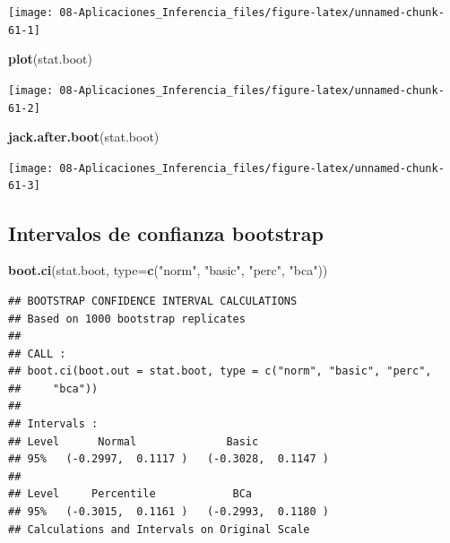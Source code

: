 \documentclass[
]{book}
\newenvironment{Shaded}{\begin{snugshade}}{\end{snugshade}}
\newcommand{\DataTypeTok}[1]{\textcolor[rgb]{0.13,0.29,0.53}{#1}}
\newcommand{\KeywordTok}[1]{\textcolor[rgb]{0.13,0.29,0.53}{\textbf{#1}}}
\newcommand{\NormalTok}[1]{#1}
\newcommand{\OperatorTok}[1]{\textcolor[rgb]{0.81,0.36,0.00}{\textbf{#1}}}
\newcommand{\OtherTok}[1]{\textcolor[rgb]{0.56,0.35,0.01}{#1}}
\newcommand{\StringTok}[1]{\textcolor[rgb]{0.31,0.60,0.02}{#1}}
\theoremstyle{break}
\theoremstyle{definition}
\theoremstyle{definition}
\theoremstyle{definition}
\theoremstyle{remark}
\begin{document}
\begin{Shaded}
\end{Shaded}

\begin{center}\texttt{[image: 08-Aplicaciones\_Inferencia\_files/figure-latex/unnamed-chunk-61-1]} \end{center}

\begin{Shaded}
\begin{Highlighting}[]
\KeywordTok{plot}\NormalTok{(stat.boot)}
\end{Highlighting}
\end{Shaded}

\begin{center}\texttt{[image: 08-Aplicaciones\_Inferencia\_files/figure-latex/unnamed-chunk-61-2]} \end{center}

\begin{Shaded}
\begin{Highlighting}[]
\KeywordTok{jack.after.boot}\NormalTok{(stat.boot)}
\end{Highlighting}
\end{Shaded}

\begin{center}\texttt{[image: 08-Aplicaciones\_Inferencia\_files/figure-latex/unnamed-chunk-61-3]} \end{center}

\hypertarget{intervalos-de-confianza-bootstrap}{%
\subsection{Intervalos de confianza bootstrap}\label{intervalos-de-confianza-bootstrap}}

\begin{Shaded}
\begin{Highlighting}[]
\KeywordTok{boot.ci}\NormalTok{(stat.boot, }\DataTypeTok{type=}\KeywordTok{c}\NormalTok{(}\StringTok{"norm"}\NormalTok{, }\StringTok{"basic"}\NormalTok{, }\StringTok{"perc"}\NormalTok{, }\StringTok{"bca"}\NormalTok{))}
\end{Highlighting}
\end{Shaded}

\begin{verbatim}
## BOOTSTRAP CONFIDENCE INTERVAL CALCULATIONS
## Based on 1000 bootstrap replicates
## 
## CALL : 
## boot.ci(boot.out = stat.boot, type = c("norm", "basic", "perc", 
##     "bca"))
## 
## Intervals : 
## Level      Normal              Basic         
## 95%   (-0.2997,  0.1117 )   (-0.3028,  0.1147 )  
## 
## Level     Percentile            BCa          
## 95%   (-0.3015,  0.1161 )   (-0.2993,  0.1180 )  
## Calculations and Intervals on Original Scale
\end{verbatim}
\end{document}
